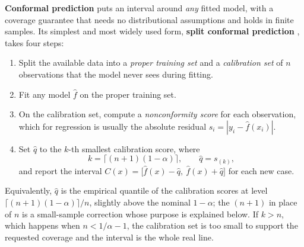 \documentclass[../ai_in_finance]{subfiles}
\begin{document}
\textbf{Conformal prediction} \parencite{vovk2022algorithmic} puts an interval around \emph{any} fitted model, with a coverage guarantee that needs no distributional assumptions and holds in finite samples. Its simplest and most widely used form, \textbf{split conformal prediction} \parencite{lei2018distribution}, takes four steps:
\begin{enumerate}
    \item Split the available data into a \emph{proper training set} and a \emph{calibration set} of $n$ observations that the model never sees during fitting.
    \item Fit any model $\hat f$ on the proper training set.
    \item On the calibration set, compute a \emph{nonconformity score} for each observation, which for regression is usually the absolute residual $s_i = |y_i - \hat f(x_i)|$.
    \item Set $\hat q$ to the $k$-th smallest calibration score, where
    \begin{equation}
    \label{eq:ml-conformal-quantile}
    k = \big\lceil (n+1)(1-\alpha) \big\rceil, \qquad \hat q = s_{(k)},
    \end{equation}
    and report the interval $C(x) = \big[\hat f(x) - \hat q,\ \hat f(x) + \hat q\big]$ for each new case.
\end{enumerate}
Equivalently, $\hat q$ is the empirical quantile of the calibration scores at level $\lceil (n+1)(1-\alpha)\rceil / n$, slightly above the nominal $1-\alpha$; the $(n+1)$ in place of $n$ is a small-sample correction whose purpose is explained below. If $k > n$, which happens when $n < 1/\alpha - 1$, the calibration set is too small to support the requested coverage and the interval is the whole real line.
\end{document}
